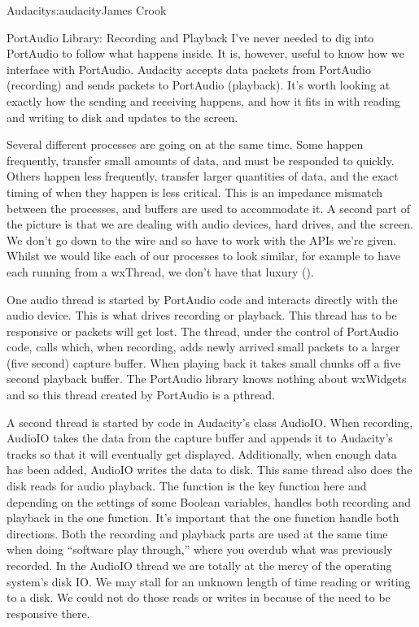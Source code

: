 \begin{aosachapter}{Audacity}{s:audacity}{James Crook}
\begin{aosasect1}{PortAudio Library: Recording and Playback}
I've never needed to dig into PortAudio to follow what happens inside.
It is, however, useful to know how we interface with PortAudio.
Audacity accepts data packets from PortAudio (recording) and sends
packets to PortAudio (playback).  It's worth looking at
exactly how the sending and
receiving happens, and how it fits in with reading and writing to disk
and updates to the screen.

Several different processes are going on at the same time.  Some
happen frequently, transfer small amounts of data, and must be
responded to quickly.  Others happen less frequently, transfer larger
quantities of data, and the exact timing of when they happen is less
critical.  This is an impedance mismatch between the processes,
and buffers are used to accommodate it.  A second part of the picture is
that we are dealing with audio devices, hard drives,
and the screen.  We don't go down to the wire and so have to work with
the APIs we're given.  Whilst we would like each of our processes to
look similar, for example to have each running from a wxThread, we
don't have that luxury ().


One audio thread is started by PortAudio code and interacts directly
with the audio device.  This is what drives recording or playback.
This thread has to be responsive or packets will get lost.  The
thread, under the control of PortAudio code, calls
 which, when recording, adds newly arrived
small packets to a larger (five second) capture buffer.  When playing
back it takes small chunks off a five second playback buffer.  The
PortAudio library knows nothing about wxWidgets and so this thread
created by PortAudio is a pthread.

A second thread is started by code in Audacity's class AudioIO\@.  When
recording, AudioIO takes the data from the capture buffer and appends
it to Audacity's tracks so that it will eventually get displayed.
Additionally, when enough data has been added, AudioIO writes the data
to disk.  This same thread also does the disk reads for audio
playback.  The function  is the key
function here and depending on the settings of some Boolean variables,
handles both recording and playback in the one function.  It's
important that the one function handle both directions.  Both the
recording and playback parts are used at the same time when doing
``software play through,'' where you overdub what was previously
recorded.  In the AudioIO thread we are totally at the mercy of the
operating system's disk IO\@.  We may stall for an unknown length of
time reading or writing to a disk.  We could not do those reads or
writes in  because of the need to be
responsive there.


\end{aosasect1}
\end{aosachapter}
